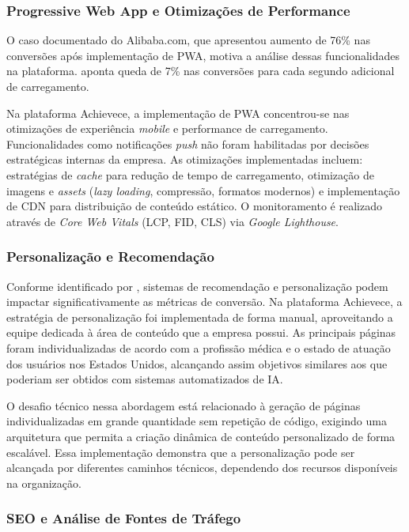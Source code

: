 \subsubsection{Progressive Web App e Otimizações de Performance}

O caso documentado do Alibaba.com, que apresentou aumento de 76\% nas conversões após implementação de PWA, motiva a análise dessas funcionalidades na plataforma. \cite{bansal_seo_2024} aponta queda de 7\% nas conversões para cada segundo adicional de carregamento.

Na plataforma Achievece, a implementação de PWA concentrou-se nas otimizações de experiência \textit{mobile} e performance de carregamento. Funcionalidades como notificações \textit{push} não foram habilitadas por decisões estratégicas internas da empresa. As otimizações implementadas incluem: estratégias de \textit{cache} para redução de tempo de carregamento, otimização de imagens e \textit{assets} (\textit{lazy loading}, compressão, formatos modernos) e implementação de CDN para distribuição de conteúdo estático. O monitoramento é realizado através de \textit{Core Web Vitals} (LCP, FID, CLS) via \textit{Google Lighthouse}.

\subsubsection{Personalização e Recomendação}

Conforme identificado por \cite{nguyen_personalized_2024}, sistemas de recomendação e personalização podem impactar significativamente as métricas de conversão. Na plataforma Achievece, a estratégia de personalização foi implementada de forma manual, aproveitando a equipe dedicada à área de conteúdo que a empresa possui. As principais páginas foram individualizadas de acordo com a profissão médica e o estado de atuação dos usuários nos Estados Unidos, alcançando assim objetivos similares aos que poderiam ser obtidos com sistemas automatizados de IA.

O desafio técnico nessa abordagem está relacionado à geração de páginas individualizadas em grande quantidade sem repetição de código, exigindo uma arquitetura que permita a criação dinâmica de conteúdo personalizado de forma escalável. Essa implementação demonstra que a personalização pode ser alcançada por diferentes caminhos técnicos, dependendo dos recursos disponíveis na organização.

\subsubsection{SEO e Análise de Fontes de Tráfego}

